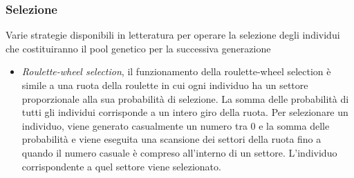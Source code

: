 \subsubsection{Selezione}
Varie strategie disponibili in letteratura per operare la selezione degli individui che costituiranno il pool genetico per la successiva generazione
\begin{itemize}
    \item \textit{Roulette-wheel selection}, il funzionamento della roulette-wheel selection è simile a una ruota della roulette in cui ogni individuo ha un settore proporzionale alla sua probabilità di selezione. La somma delle probabilità di tutti gli individui corrisponde a un intero giro della ruota. Per selezionare un individuo, viene generato casualmente un numero tra $0$ e la somma delle probabilità e viene eseguita una scansione dei settori della ruota fino a quando il numero casuale è compreso all'interno di un settore. L'individuo corrispondente a quel settore viene selezionato.


\end{itemize}
